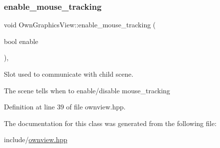 \subsubsection{\texorpdfstring{enable\+\_\+mouse\+\_\+tracking}{enable\_mouse\_tracking}}
{\footnotesize\ttfamily void Own\+Graphics\+View\+::enable\+\_\+mouse\+\_\+tracking (\begin{DoxyParamCaption}\item[{bool}]{enable }\end{DoxyParamCaption})\hspace{0.3cm}{\ttfamily [inline]}, {\ttfamily [slot]}}



Slot used to communicate with child scene. 

The scene tells when to enable/disable mouse\+\_\+tracking 

Definition at line 39 of file ownview.\+hpp.



The documentation for this class was generated from the following file\+:\begin{DoxyCompactItemize}
\item 
include/\mbox{\hyperlink{ownview_8hpp}{ownview.\+hpp}}\end{DoxyCompactItemize}
